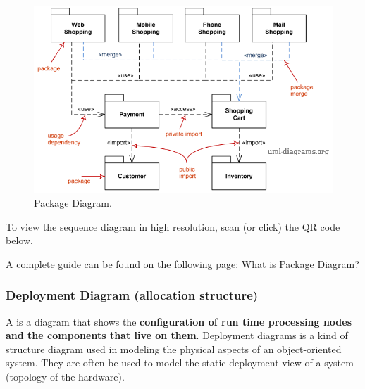 \begin{figure}[!htp]
    \centering
    \includegraphics[width=\textwidth]{img/package-diagram.png}
    \caption{Package Diagram.}
\end{figure}

\noindent
To view the sequence diagram in high resolution, scan (or click) the QR code below.
\begin{center}
\end{center}
A complete guide can be found on the following page: \href{https://www.visual-paradigm.com/guide/uml-unified-modeling-language/what-is-package-diagram/}{What is Package Diagram?
}

\newpage

\subsubsection{Deployment Diagram (allocation structure)}

A  is a diagram that shows the \textbf{configuration of run time processing nodes and the components that live on them}. Deployment diagrams is a kind of structure diagram used in modeling the physical aspects of an object-oriented system. They are often be used to model the static deployment view of a system (topology of the hardware).


